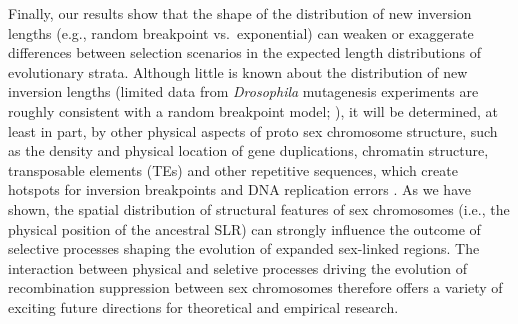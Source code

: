 \documentclass{article}[12pt]
\newcommand\hl[1]{%
  \bgroup
  \hskip0pt\color{blue!80!black}%
  #1%
  \egroup
}
\begin{document}
Finally, our results show that the shape of the distribution of new inversion lengths (e.g., random breakpoint vs.~exponential) can weaken or exaggerate differences between selection scenarios in the expected length distributions of evolutionary strata. Although little is known about the distribution of new inversion lengths (limited data from {\itshape Drosophila} mutagenesis experiments are roughly consistent with a random breakpoint model; \citealt{KrimbasPowell1992}), it will be determined, at least in part, by other physical aspects of proto sex chromosome structure, such as the density and physical location of gene duplications, chromatin structure, transposable elements (TEs) and other repetitive sequences, which create hotspots for inversion breakpoints and DNA replication errors \citep[e.g.,][]{Charlesworth1994, PevznerTesler2003, PengPevznerTesler2006, LeeBatzer2008}. As we have shown, the spatial distribution of structural features of sex chromosomes (i.e., the physical position of the ancestral SLR) can strongly influence the outcome of selective processes shaping the evolution of expanded sex-linked regions. The interaction between physical and seletive processes driving the evolution of recombination suppression between sex chromosomes therefore offers a variety of exciting future directions for theoretical and empirical research. 






\end{document}
